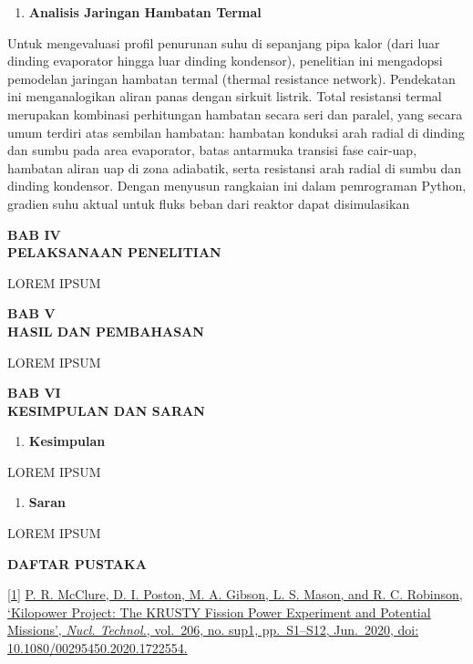 \documentclass[
]{article}
\providecommand{\tightlist}{%
  \setlength{\itemsep}{0pt}\setlength{\parskip}{0pt}}
\begin{document}
\begin{enumerate}
\def\labelenumi{\arabic{enumi}.}
\setcounter{enumi}{4}
\tightlist
\item
  \textbf{Analisis Jaringan Hambatan Termal}
\end{enumerate}

Untuk mengevaluasi profil penurunan suhu di sepanjang pipa kalor (dari
luar dinding evaporator hingga luar dinding kondensor), penelitian ini
mengadopsi pemodelan jaringan hambatan termal (thermal resistance
network). Pendekatan ini menganalogikan aliran panas dengan sirkuit
listrik. Total resistansi termal merupakan kombinasi perhitungan
hambatan secara seri dan paralel, yang secara umum terdiri atas sembilan
hambatan: hambatan konduksi arah radial di dinding dan sumbu pada area
evaporator, batas antarmuka transisi fase cair-uap, hambatan aliran uap
di zona adiabatik, serta resistansi arah radial di sumbu dan dinding
kondensor. Dengan menyusun rangkaian ini dalam pemrograman Python,
gradien suhu aktual untuk fluks beban dari reaktor dapat disimulasikan

\textbf{BAB IV}\\
\textbf{PELAKSANAAN PENELITIAN}

LOREM IPSUM

\textbf{BAB V}\\
\textbf{HASIL DAN PEMBAHASAN}

LOREM IPSUM

\textbf{BAB VI}\\
\textbf{KESIMPULAN DAN SARAN}

\begin{enumerate}
\def\labelenumi{\arabic{enumi}.}
\tightlist
\item
  \textbf{Kesimpulan}
\end{enumerate}

LOREM IPSUM

\begin{enumerate}
\def\labelenumi{\arabic{enumi}.}
\setcounter{enumi}{1}
\tightlist
\item
  \textbf{Saran}
\end{enumerate}

LOREM IPSUM

\textbf{DAFTAR PUSTAKA}

\href{https://www.zotero.org/google-docs/?cab6zL}{{[}1{]}}
\href{https://www.zotero.org/google-docs/?cab6zL}{P. R. McClure, D. I.
Poston, M. A. Gibson, L. S. Mason, and R. C. Robinson, `Kilopower
Project: The KRUSTY Fission Power Experiment and Potential Missions',
\emph{Nucl. Technol.}, vol.~206, no. sup1, pp.~S1--S12, Jun.~2020, doi:
10.1080/00295450.2020.1722554.}
\end{document}
